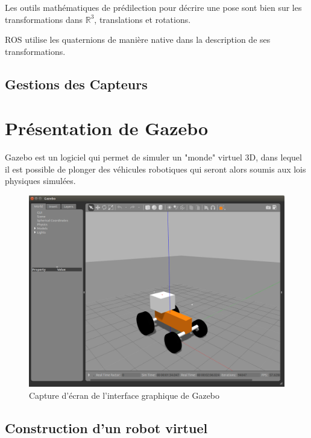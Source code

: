 \documentclass[12pt,a4paper]{report}
\begin{document}
		
		\para Les outils mathématiques de prédilection pour décrire une pose sont bien sur les transformations dans $\mathbb{R}^3$, translations et rotations. 
		
		
		\para ROS utilise les quaternions de manière native dans la description de ses transformations. 
		
		
		
		\subsection{Gestions des Capteurs}
		
		\newpage
	\section{Présentation de Gazebo}
	
	Gazebo est un logiciel qui permet de simuler un "monde" virtuel 3D, dans lequel il est possible de plonger des véhicules robotiques qui seront alors soumis aux lois physiques simulées.
		
	\begin{figure}[h!]
		\centering
		\includegraphics[width=0.7\linewidth]{img/gazebo}
		\caption[gazebo]{Capture d'écran de l'interface graphique de Gazebo}
		\label{fig:gazebo}
	\end{figure}
	
		\subsection{Construction d'un robot virtuel}
		
\end{document}
